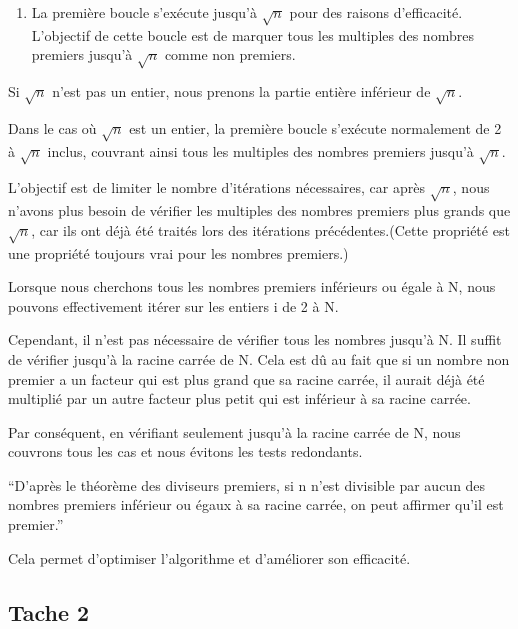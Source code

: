 \documentclass[
]{article}
\providecommand{\tightlist}{%
  \setlength{\itemsep}{0pt}\setlength{\parskip}{0pt}}
\begin{document}
\begin{enumerate}
\def\labelenumi{\arabic{enumi}.}
\setcounter{enumi}{2}
\tightlist
\item
  La première boucle s'exécute jusqu'à \(\sqrt{n}\) pour des raisons
  d'efficacité. L'objectif de cette boucle est de marquer tous les
  multiples des nombres premiers jusqu'à \(\sqrt{n}\) comme non
  premiers.
\end{enumerate}

Si \(\sqrt{n}\) n'est pas un entier, nous prenons la partie entière
inférieur de \(\sqrt{n}\).

Dans le cas où \(\sqrt{n}\) est un entier, la première boucle s'exécute
normalement de 2 à \(\sqrt{n}\) inclus, couvrant ainsi tous les
multiples des nombres premiers jusqu'à \(\sqrt{n}\).

L'objectif est de limiter le nombre d'itérations nécessaires, car après
\(\sqrt{n}\), nous n'avons plus besoin de vérifier les multiples des
nombres premiers plus grands que \(\sqrt{n}\), car ils ont déjà été
traités lors des itérations précédentes.(Cette propriété est une
propriété toujours vrai pour les nombres premiers.)

Lorsque nous cherchons tous les nombres premiers inférieurs ou égale à
N, nous pouvons effectivement itérer sur les entiers i de 2 à N.

Cependant, il n'est pas nécessaire de vérifier tous les nombres jusqu'à
N. Il suffit de vérifier jusqu'à la racine carrée de N. Cela est dû au
fait que si un nombre non premier a un facteur qui est plus grand que sa
racine carrée, il aurait déjà été multiplié par un autre facteur plus
petit qui est inférieur à sa racine carrée.

Par conséquent, en vérifiant seulement jusqu'à la racine carrée de N,
nous couvrons tous les cas et nous évitons les tests redondants.

``D'après le théorème des diviseurs premiers, si n n'est divisible par
aucun des nombres premiers inférieur ou égaux à sa racine carrée, on
peut affirmer qu'il est premier.''

Cela permet d'optimiser l'algorithme et d'améliorer son efficacité.

\pagebreak

\hypertarget{tache-2}{%
\subsection{Tache 2}\label{tache-2}}
\end{document}
